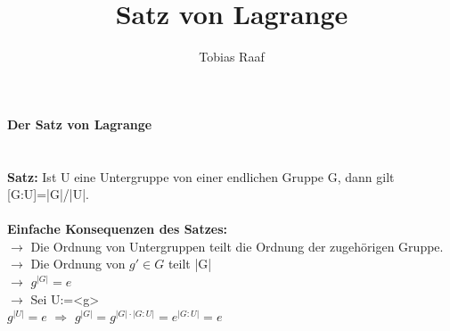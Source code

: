 \documentclass{scrartcl}
\title{Satz von Lagrange}
\author{Tobias Raaf}
\begin{document}
	\large \textbf{Der Satz von Lagrange}\\\\
	\normalsize\\
	\textbf{Satz:}  Ist U eine Untergruppe von einer endlichen Gruppe G, dann gilt [G:U]=|G|/|U|.\\\\
	\textbf{Einfache Konsequenzen des Satzes:}\\
	$\rightarrow$ Die Ordnung von Untergruppen teilt die Ordnung der zugehörigen Gruppe.\\
	$\rightarrow$ Die Ordnung von $g'\in G$ teilt |G|\\
	$\rightarrow$ $g^{|G|}=e$\\
	$\rightarrow$ Sei U:=<{g}>\\
	$g^{|U|}=e$ $\Rightarrow$ $g^{|G|}=g^{|G|\cdot |G:U|}=e^{|G:U|}=e$\\
\end{document}
